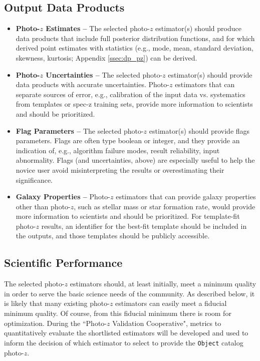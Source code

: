 \documentclass[DM,authoryear,toc]{lsstdoc}
\begin{document}
\subsection{Output Data Products} 
\begin{itemize}
\item \textbf{Photo-$z$ Estimates -- } 
The selected photo-$z$ estimator(s) should produce data products that include full posterior distribution functions, and for which derived point estimates with statistics (e.g., mode, mean, standard deviation, skewness, kurtosis; Appendix \ref{ssec:dp_pz}) can be derived.
\item \textbf{Photo-$z$ Uncertainties -- }
The selected photo-$z$ estimator(s) should provide data products with accurate uncertainties.
Photo-$z$ estimators that can separate sources of error, e.g., calibration of the input data vs. systematics from templates or spec-z training sets, provide more information to scientists and should be prioritized.
\item \textbf{Flag Parameters -- }
The selected photo-$z$ estimator(s) should provide flags parameters.
Flags are often type boolean or integer, and they provide an indication of, e.g., algorithm failure modes, result reliability, input abnormality.
Flags (and uncertainties, above) are especially useful to help the novice user avoid misinterpreting the results or overestimating their significance.
\item \textbf{Galaxy Properties -- }
Photo-$z$ estimators that can provide galaxy properties other than photo-$z$, such as stellar mass or star formation rate, would provide more information to scientists and should be prioritized.
For template-fit photo-$z$ results, an identifier for the best-fit template should be included in the outputs, and those templates should be publicly accessible.
\end{itemize}

\subsection{Scientific Performance}

The selected photo-$z$ estimators should, at least initially, meet a minimum quality in order to serve the basic science needs of the community.
As described below, it is likely that many existing photo-$z$ estimators can easily meet a fiducial minimum quality.
Of course, from this fiducial minimum there is room for optimization.
During the ``Photo-$z$ Validation Cooperative", metrics to quantitatively evaluate the shortlisted estimators will be developed and used to inform the decision of which estimator to select to provide the {\tt Object} catalog photo-$z$.
\end{document}
